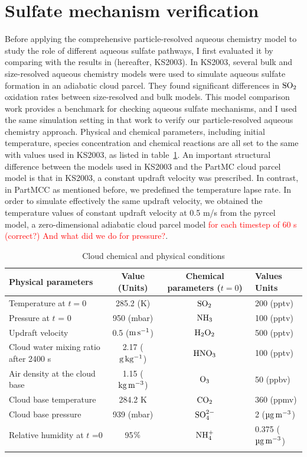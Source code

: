 \documentclass[edeposit,fullpage]{uiucthesis2009}
\begin{document}
\section{Sulfate mechanism verification}
\label{chap2.3}
Before applying the comprehensive particle-resolved aqueous chemistry
model to study the role of different aqueous sulfate pathways, I first
evaluated it by comparing with the results in
\cite{kreidenweis2003modification}(hereafter, KS2003). In KS2003,
several bulk and size-resolved aqueous chemistry models were used to
simulate aqueous sulfate formation in an adiabatic cloud parcel. They
found significant differences in $\rm SO_2$ oxidation rates between
size-resolved and bulk models. This model comparison work provides a
benchmark for checking aqueous sulfate mechanisms, and I used the same
simulation setting in that work to verify our particle-resolved
aqueous chemistry approach. Physical and chemical parameters,
including initial temperature, species concentration and chemical
reactions are all set to the same with values used in KS2003, as
listed in table~\ref{setting}. An important structural difference
between the models used in KS2003 and the PartMC cloud parcel model is
that in KS2003, a constant updraft velocity was prescribed. In
contrast, in PartMCC as mentioned before, we predefined the
temperature lapse rate. In order to simulate effectively the same
updraft velocity, we obtained the temperature values of constant
updraft velocity at 0.5 m/s from the pyrcel model, a zero-dimensional
adiabatic cloud parcel model \citep{rothenberg2016metamodeling}
\textcolor{red}{for each timestep of 60 s (correct?) And what did we
  do for pressure?}.

\begin{table}[ht]
\centering
\begin{threeparttable}
\caption{Cloud  chemical and physical conditions}
 \begin{tabular}{l c|c l}
 \hline
  Physical parameters & Value (Units) & Chemical parameters ($t = 0$) & Values Units\\
 \hline
 Temperature at $t =0$ & 285.2 (K)&$\rm SO_2$ & 200 (pptv)\\
 Pressure at $t$ = 0 & 950 (mbar)&$\rm NH_3$ & 100 (pptv)\\
 Updraft velocity & 0.5 ($\rm m\,s^{-1}$)&$\rm H_2O_2$ & 500 (pptv)\\
 Cloud water mixing ratio after 2400 s& 2.17 ($\rm g\,kg^{-1}$)&$\rm HNO_3$  & 100 (pptv)\\
 Air density at the cloud base & 1.15 ($\rm kg\,m^{-3}$) & $\rm O_3$ &50 (ppbv)\\
 Cloud base temperature& 284.2 K&$\rm CO_2$ & 360 (ppmv)\\
 Cloud base pressure& 939 (mbar)& $\rm SO_4^{2-}$ & 2 ($\rm \mu g \, m^{-3}$)\\ 
 Relative humidity at $t$ =0 & 95$\rm \%$ & $\rm NH_4^+$ & 0.375 ($\rm \mu g\, m^{-3}$)\\
 \hline
 \label{setting}
\end{tabular}
\end{threeparttable}
\end{table}
\end{document}
